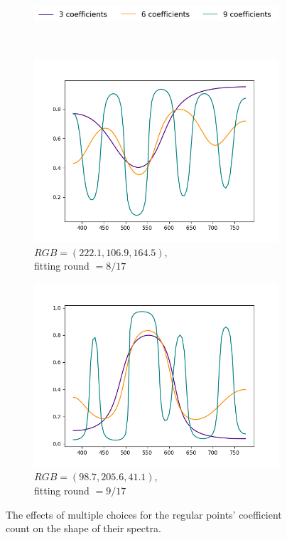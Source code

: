 \begin{figure}[t]
	\centering
	\captionsetup[subfigure]{font=footnotesize,labelfont=footnotesize}
	\captionsetup[subfigure]{justification=centering}
	\begin{subfigure}[t]{0.60\textwidth}
		\includegraphics[width=\linewidth]{img/results_noOfMoments_regularPts_legend.png}
	\end{subfigure} \\
	\begin{subfigure}[t]{0.45\textwidth}
		\includegraphics[width=\linewidth]{img/results_noOfMoments_regularPts_1.png}
		\caption{$RGB=(222.1, 106.9, 164.5)$,\\ fitting round $= 8/17$}
	\end{subfigure}
	\begin{subfigure}[t]{0.45\textwidth}
		\includegraphics[width=\linewidth]{img/results_noOfMoments_regularPts_2.png}
		\caption{$RGB=(98.7, 205.6, 41.1)$,\\ fitting round $= 9/17$}
	\end{subfigure} 
	\caption{The effects of multiple choices for the regular points' coefficient count on the shape of their spectra.}
	\label{fig:noOfMoments_regularPoints}
\end{figure}

